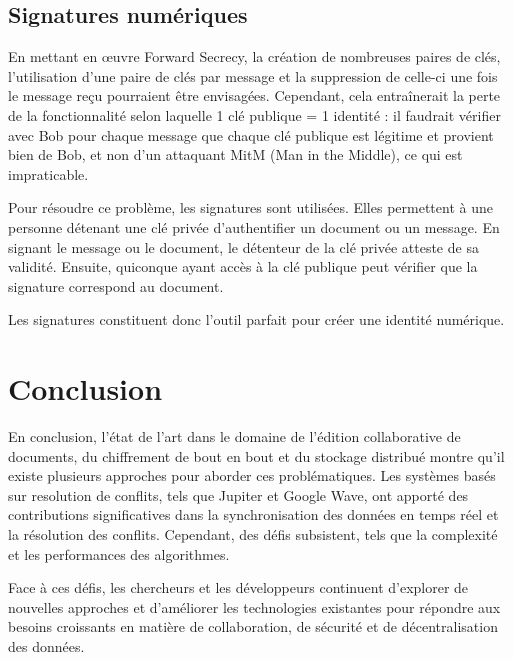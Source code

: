 \subsection{Signatures numériques}

En mettant en \oe{}uvre Forward Secrecy, la création de nombreuses paires de clés, l'utilisation d'une paire de clés par message et la suppression de celle-ci une fois le message reçu pourraient être envisagées. Cependant, cela entraînerait la perte de la fonctionnalité selon laquelle 1 clé publique = 1 identité : il faudrait vérifier avec Bob pour chaque message que chaque clé publique est légitime et provient bien de Bob, et non d'un attaquant \gls{MitM} (Man in the Middle), ce qui est impraticable.

Pour résoudre ce problème, les signatures sont utilisées. Elles permettent à une personne détenant une clé privée d'authentifier un document ou un message. En signant le message ou le document, le détenteur de la clé privée atteste de sa validité. Ensuite, quiconque ayant accès à la clé publique peut vérifier que la signature correspond au document.

Les signatures constituent donc l'outil parfait pour créer une identité numérique.

\section{Conclusion}
En conclusion, l'état de l'art dans le domaine de l'édition collaborative de
documents, du chiffrement de bout en bout et du stockage distribué montre qu'il
existe plusieurs approches pour aborder ces problématiques. Les systèmes basés
sur resolution de conflits, tels que Jupiter et Google Wave, ont apporté des
contributions significatives dans la synchronisation des données en temps réel
et la résolution des conflits. Cependant, des défis subsistent, tels que la
complexité et les performances des algorithmes.

Face à ces défis, les chercheurs et les développeurs continuent d'explorer de nouvelles approches et d'améliorer les technologies existantes pour répondre aux besoins croissants en matière de collaboration, de sécurité et de décentralisation des données.